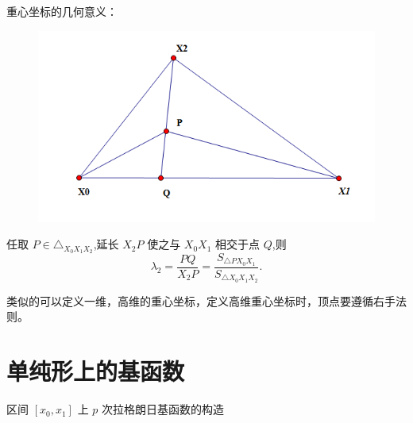 \documentclass{article}
\begin{document}
重心坐标的几何意义：

\begin{figure}[H]
\centering
\includegraphics[scale=0.7]{./figures/2.png}
\caption{}
\end{figure}

任取 $P\in \triangle_{X_0 X_1 X_2}$,延长 $X_2 P$ 使之与 $X_0 X_1$ 相交于点 $Q$,则
$$
\lambda _2=\frac {PQ}{X_2 P}=\frac{S_{\triangle PX_0 X_1}}{S_{\triangle X_0 X_1 X_2}}.
$$

类似的可以定义一维，高维的重心坐标，定义高维重心坐标时，顶点要遵循右手法则。

\section{单纯形上的基函数}
区间 $[x_0,x_1]$ 上 $p$ 次拉格朗日基函数的构造
\end{document}

